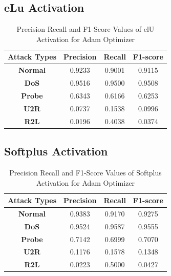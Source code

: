 \documentclass[12pt, a4paper]{report}
\begin{document}
\begin{appendices}
	\subsection{eLu Activation}
   \begin{table}[h]
	\centering
	\captionsetup{justification=centering,margin=2cm}
	\begin{tabular}{|c|c|c|c|}
	\hline
	\textbf{Attack Types} & \textbf{Precision} & \textbf{Recall} & \textbf{F1-score} \\ \hline
	\textbf{Normal}       & 0.9233             & 0.9001          & 0.9115            \\ \hline
	\textbf{DoS}          & 0.9516             & 0.9500          & 0.9508            \\ \hline
	\textbf{Probe}        & 0.6343             & 0.6166          & 0.6253            \\ \hline
	\textbf{U2R}          & 0.0737             & 0.1538          & 0.0996            \\ \hline
	\textbf{R2L}          & 0.0196             & 0.4038          & 0.0374            \\ \hline
	\end{tabular}
	\caption{Precision Recall and F1-Score Values of elU Activation for Adam Optimizer}
	\label{classification elu adam tflearn}
	\end{table} 
	
	\clearpage
	\subsection{Softplus Activation}
   \begin{table}[ht]
	\centering
	\captionsetup{justification=centering,margin=2cm}
	\begin{tabular}{|c|c|c|c|}
	\hline
	\textbf{Attack Types} & \textbf{Precision} & \textbf{Recall} & \textbf{F1-score} \\ \hline
	\textbf{Normal}       & 0.9383             & 0.9170          & 0.9275            \\ \hline
	\textbf{DoS}          & 0.9524             & 0.9587          & 0.9555            \\ \hline
	\textbf{Probe}        & 0.7142             & 0.6999          & 0.7070            \\ \hline
	\textbf{U2R}          & 0.1176             & 0.1578          & 0.1348            \\ \hline
	\textbf{R2L}          & 0.0223             & 0.5000          & 0.0427            \\ \hline
	\end{tabular}
	\caption{Precision Recall and F1-Score Values of Softplus Activation for Adam Optimizer}
	\label{classification softplus adam tflearn}
	\end{table} 
	

\end{appendices}
\end{document}
